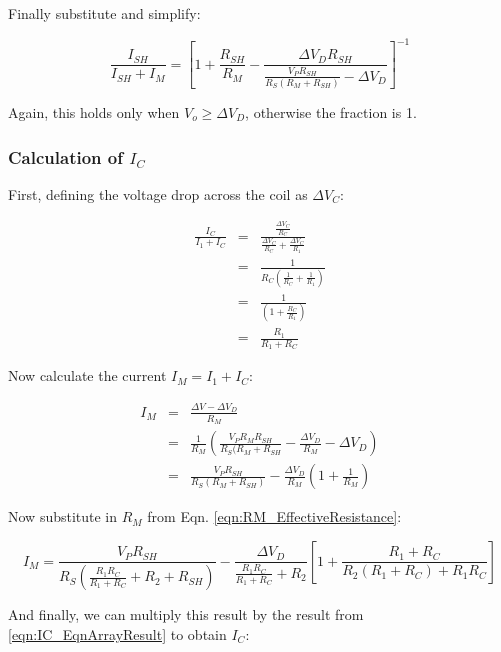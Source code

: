 \documentclass[../PaulGanssle-Thesis.tex]{subfiles}
\begin{document}
Finally substitute and simplify:

\begin{equation}
\frac{I_{SH}}{I_{SH} + I_{M}} = \left[1 + \frac{R_{SH}}{R_M} - \frac{\Delta V_{D}R_{SH}}{\frac{V_P R_{SH}}{R_S(R_{M}+R_{SH})} - \Delta V_{D}}\right]^{-1}
\end{equation}

Again, this holds only when $V_o \geq \Delta V_D$, otherwise the fraction is 1.

\subsubsection{Calculation of $I_C$}
\label{proofs.circuits.pulse.coil}
First, defining the voltage drop across the coil as $\Delta V_C$:

\begin{eqnarray}
\frac{I_C}{I_1 + I_C} & = & \frac{\frac{\Delta V_C}{R_C}}{\frac{\Delta V_C}{R_C} + \frac{\Delta V_C}{R_1}} \\
& = & \frac{1}{R_{C}\left(\frac{1}{R_C} + \frac{1}{R_1}\right)} \\
& = & \frac{1}{\left(1 + \frac{R_C}{R_1}\right)} \\
& = & \frac{R_1}{R_1 + R_C} \label{eqn:IC_EqnArrayResult}
\end{eqnarray}

Now calculate the current $I_M = I_1 + I_C$:

\begin{eqnarray}
I_M & = & \frac{\Delta V - \Delta V_D}{R_M} \\
 & = & \frac{1}{R_M}\left(\frac{V_{P}R_{M}R_{SH}}{R_{S}(R_{M} + R_{SH}} - \frac{\Delta V_D}{R_M} - \Delta V_D\right) \\
 & = & \frac{V_P R_{SH}}{R_{S}(R_{M} + R_{SH})} - \frac{\Delta V_{D}}{R_{M}}\left(1 + \frac{1}{R_{M}}\right)
\end{eqnarray}

Now substitute in $R_M$ from Eqn. \ref{eqn:RM_EffectiveResistance}:

\begin{equation}
I_M = \frac{V_P R_{SH}}{R_{S}\left(\frac{R_{1}R_{C}}{R_{1} + R_{C}} + R_2 + R_{SH}\right)} - \frac{\Delta V_D}{\frac{R_{1}R_{C}}{R_{1} + R_{C}} + R_{2}}\left[1 + \frac{R_{1} + R_{C}}{R_{2}(R_{1} + R_{C}) + R_{1}R_{C}}\right]
\end{equation}

And finally, we can multiply this result by the result from \ref{eqn:IC_EqnArrayResult} to obtain $I_C$:
\end{document}
